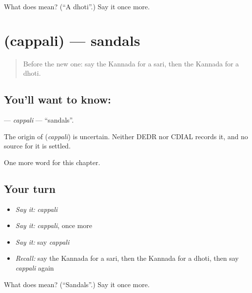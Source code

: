 \begin{tcolorbox}[breakable,colback=teal!4,colframe=teal!35!black,title={Before you move on}]
What does  mean? (\textquotedblleft{}A dhoti\textquotedblright{}.) Say it once more.
\end{tcolorbox}
\section[\texorpdfstring{\kn{ಚಪ್ಪಲಿ} (cappali)}{ಚಪ್ಪಲಿ (cappali)}]{ (cappali) — sandals}

\label{lesson:KA-C120-cappali}



\begin{quote}
Before the new one: say the Kannada for a sari, then the Kannada for a dhoti.
\end{quote}

\subsection*{You'll want to know: }
\textbf{} — \emph{cappali} — \textquotedblleft{}sandals\textquotedblright{}.

\begin{cousinweb}
The origin of \textbf{} (\emph{cappali}) is uncertain. Neither DEDR nor CDIAL records it, and no source for it is settled.
\end{cousinweb}

\begin{grammarlens}[title={What you've built}]
One more word for this chapter.
\end{grammarlens}

\subsection*{Your turn}
\begin{itemize}
\raggedright
  \item \emph{Say it:} \emph{cappali}
  \item \emph{Say it:} \emph{cappali}, once more
  \item \emph{Say it:} say \emph{cappali}
  \item \emph{Recall:} say the Kannada for a sari, then the Kannada for a dhoti, then say \emph{cappali} again
\end{itemize}

\begin{tcolorbox}[breakable,colback=teal!4,colframe=teal!35!black,title={Before you move on}]
What does  mean? (\textquotedblleft{}Sandals\textquotedblright{}.) Say it once more.
\end{tcolorbox}
